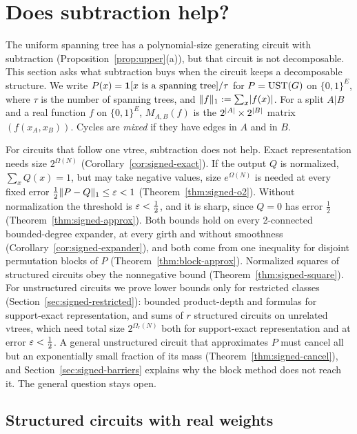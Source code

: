 \section{Does subtraction help?}\label{sec:signed}

The uniform spanning tree has a polynomial-size generating circuit with subtraction (Proposition~\ref{prop:upper}(a)), but that circuit is not decomposable. This section asks what subtraction buys when the circuit keeps a decomposable structure. We write $P(x)=\mathbf{1}[x\text{ is a spanning tree}]/\tau$ for $P=\mathrm{UST}(G)$ on $\{0,1\}^E$, where $\tau$ is the number of spanning trees, and $\lVert f\rVert_1:=\sum_x\lvert f(x)\rvert$. For a split $A|B$ and a real function $f$ on $\{0,1\}^E$, $M_{A,B}(f)$ is the $2^{\lvert A\rvert}\times2^{\lvert B\rvert}$ matrix $(f(x_A,x_B))$. Cycles are \emph{mixed} if they have edges in $A$ and in $B$.

For circuits that follow one vtree, subtraction does not help. Exact representation needs size $2^{\Omega(N)}$ (Corollary~\ref{cor:signed-exact}). If the output $Q$ is normalized, $\sum_xQ(x)=1$, but may take negative values, size $e^{\Omega(N)}$ is needed at every fixed error $\frac12\lVert P-Q\rVert_1\le\varepsilon<1$ (Theorem~\ref{thm:signed-o2}). Without normalization the threshold is $\varepsilon<\frac12$, and it is sharp, since $Q=0$ has error $\frac12$ (Theorem~\ref{thm:signed-approx}). Both bounds hold on every 2-connected bounded-degree expander, at every girth and without smoothness (Corollary~\ref{cor:signed-expander}), and both come from one inequality for disjoint permutation blocks of $P$ (Theorem~\ref{thm:block-approx}). Normalized squares of structured circuits obey the nonnegative bound (Theorem~\ref{thm:signed-square}). For unstructured circuits we prove lower bounds only for restricted classes (Section~\ref{sec:signed-restricted}): bounded product-depth and formulas for support-exact representation, and sums of $r$ structured circuits on unrelated vtrees, which need total size $2^{\Omega_r(N)}$ both for support-exact representation and at error $\varepsilon<\frac12$. A general unstructured circuit that approximates $P$ must cancel all but an exponentially small fraction of its mass (Theorem~\ref{thm:signed-cancel}), and Section~\ref{sec:signed-barriers} explains why the block method does not reach it. The general question stays open.

\subsection{Structured circuits with real weights}

